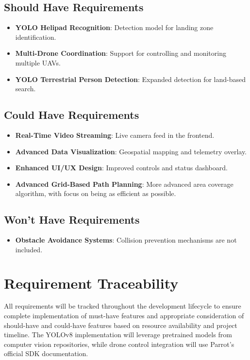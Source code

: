 \subsection{Should Have Requirements}
\begin{itemize}
    \item \textbf{YOLO Helipad Recognition}: Detection model for landing zone identification.
    \item \textbf{Multi-Drone Coordination}: Support for controlling and monitoring multiple UAVs.
    \item \textbf{YOLO Terrestrial Person Detection}: Expanded detection for land-based search.
\end{itemize}

\subsection{Could Have Requirements}
\begin{itemize}
    \item \textbf{Real-Time Video Streaming}: Live camera feed in the frontend.
    \item \textbf{Advanced Data Visualization}: Geospatial mapping and telemetry overlay.
    \item \textbf{Enhanced UI/UX Design}: Improved controls and status dashboard.
    \item \textbf{Advanced Grid-Based Path Planning}: More advanced area coverage algorithm, with focus on being as efficient as possible.
\end{itemize}

\subsection{Won't Have Requirements}
\begin{itemize}
    \item \textbf{Obstacle Avoidance Systems}: Collision prevention mechanisms are not included.
\end{itemize}

\section{Requirement Traceability}
All requirements will be tracked throughout the development lifecycle to ensure complete implementation of must-have features and appropriate consideration of should-have and could-have features based on resource availability and project timeline. The YOLOv8 implementation will leverage pretrained models from computer vision repositories, while drone control integration will use Parrot's official SDK documentation.
